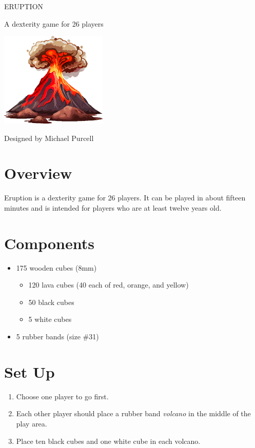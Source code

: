 \documentclass[parskip=half]{scrartcl}
\begin{document}
\color{eruption_purple}
{
\enlargethispage{1.0\baselineskip}
\begin{center}
\setmainfont[Scale=1.0]{Earthquake MF} \Huge
ERUPTION

\setmainfont{URWClassico} \footnotesize
A dexterity game for 2\textendash{}6 players

\vfill

\includegraphics[width=2.0in]{Images/one_volcano.png}

\vfill

\setmainfont{URWClassico}
\normalsize
Designed by Michael Purcell
\end{center}
}

\newpage
\raggedright
\setmainfont{URWClassico} \small
\section*{Overview}
Eruption is a dexterity game for 2\textendash{}6 players. It can be played in about fifteen minutes and is intended for players who are at least twelve years old.

\section*{Components}
\begin{itemize}[leftmargin=*]
\item 175 wooden cubes (8mm)
\begin{itemize}[leftmargin=*]
\item 120 lava cubes (40 each of red, orange, and yellow)
\item 50 black cubes
\item 5 white cubes
\end{itemize}
\item 5 rubber bands (size \#31)
\end{itemize}

\newpage

\section*{Set Up}
\begin{enumerate}[leftmargin=*]
\item Choose one player to go first.

\item Each other player should place a rubber band \emph{volcano} in the middle of the play area.

\item Place ten black cubes and one white cube in each volcano.
\end{enumerate}
\end{document}
